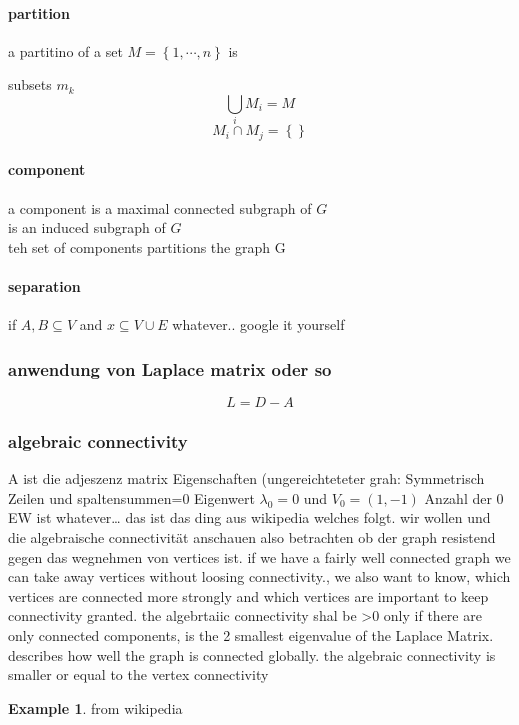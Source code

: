 \documentclass[a4paper]{article}
\theoremstyle{definition}
\newtheorem{example}{Example}
\theoremstyle{remark}
\begin{document}
\paragraph{partition}
\label{par:partition}


a partitino of a set $M=\left\{ 1,\cdots,n \right\}$ is

subsets $m_k$
\begin{equation}
\bigcup_iM_i=M
\end{equation}
\begin{equation}
  M_i\cap M_j=\left\{  \right\}
\end{equation}
\paragraph{component}
\label{par:component}

a component is a maximal connected subgraph of $G$\\
is an induced subgraph of $G$\\
teh set of components partitions the graph G
\paragraph{separation}
\label{par:separation}

if $A,B\subseteq V$ and $x\subseteq V\cup E$
whatever.. google it yourself

\subsubsection{anwendung von Laplace matrix oder so}
\label{ssub:anwendung_von_laplace_matrix_oder_so}
 \begin{equation}
   L=D-A
 \end{equation}
 \subsubsection{algebraic connectivity}
 \label{ssub:algebraic_connectivity}
 
 
A ist die adjeszenz matrix
Eigenschaften (ungereichteteter grah:
  Symmetrisch Zeilen und spaltensummen=0
  Eigenwert $\lambda_0=0$ und  $V_0=(1,-1)$
  Anzahl der 0 EW ist whatever\ldots
  das ist das ding aus wikipedia welches folgt. wir wollen und die algebraische connectivität anschauen also betrachten ob der graph resistend gegen das wegnehmen von vertices ist.
  if we have a fairly well connected graph we can take away vertices without loosing connectivity., we also want to know, which vertices are connected more strongly and which vertices are important to keep connectivity granted.
  the algebrtaiic connectivity shal be >0 only if there are only connected components, is the 2 smallest eigenvalue of the Laplace Matrix.
  describes how well the graph is connected globally.
the algebraic connectivity is smaller or equal to the  vertex connectivity
\begin{example}
  from wikipedia
\end{example}
\end{document}

